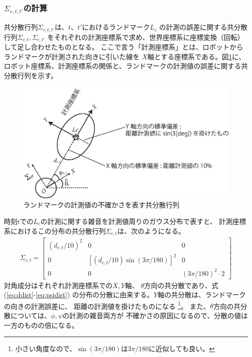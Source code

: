 \subsubsection{$\Sigma_{c,t,t'}$の計算}

共分散行列$\Sigma_{c,t,t'}$は、$t$、$t'$におけるランドマーク$L_c$
の計測の誤差に関する共分散行列$\Sigma_{c,t}, \Sigma_{c,t'}$
をそれぞれの計測座標系で求め、世界座標系に座標変換（回転）して足し合わせたものとなる。
ここで言う「計測座標系」とは、ロボットからランドマークが計測された向きに引いた線を
$X$軸とする座標系である。図\ref{fig:observation_noise}に、
ロボット座標系、計測座標系の関係と、ランドマークの計測値の誤差に関する共分散行列を示す。

\begin{figure}[htbp]
	\begin{center}
		\includegraphics[width=0.8\linewidth]{./figs/observation_noise.eps}
		\caption{ランドマークの計測値の不確かさを表す共分散行列}
		\label{fig:observation_noise}
	\end{center}
\end{figure}


時刻$t$での$L_c$の計測に関する雑音を計測値周りのガウス分布で表すと、
計測座標系におけるこの分布の共分散行列$\Sigma_{c,t}$は、次のようになる。
\begin{align}
	\Sigma_{c,t} =
	\begin{bmatrix}
	(d_{c,t}/10)^2 & 0 & 0 \\
	0 & [(d_{c,t}/10)\sin(3\pi/180)]^2 & 0 \\
	0 & 0 & (3\pi/180)^2\cdot 2
	\end{bmatrix}
\end{align}
対角成分はそれぞれ計測座標系での$X,Y$軸、
$\theta$方向の共分散であり、式(\ref{eq:ddist}-\ref{eq:psidist})
の分布の分散に由来する。$Y$軸の共分散は、ランドマークの向きの計測誤差に、
距離の計測値を掛けたものになる
\footnote{小さい角度なので、$\sin(3\pi/180)$は$3\pi/180$に近似しても良い。}。
また、$\theta$方向の共分散については、$\phi,\psi$の計測の雑音両方が
不確かさの原因になるので、分散の値は一方のものの倍になる。

